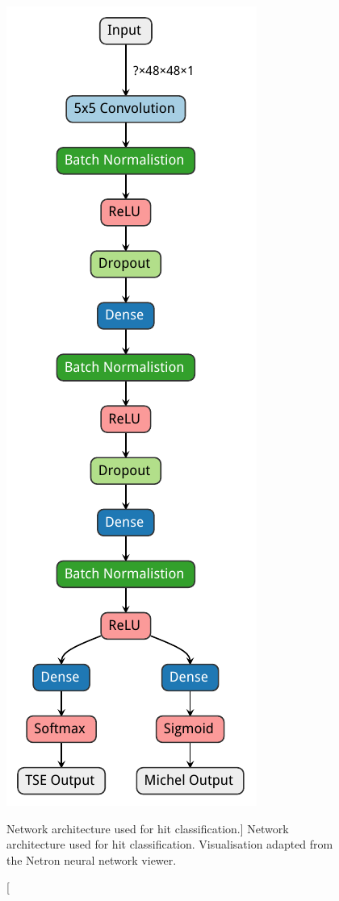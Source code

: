 \begin{figure}
	\centering
	\includegraphics[height=0.9\textheight]{figures/track_shower_arch.pdf}
	\caption
	[Network architecture used for hit classification.]
	{Network architecture used for hit classification. Visualisation adapted from
	the Netron neural network viewer\cite{netron}.}
	\label{fig:arch}
\end{figure}

